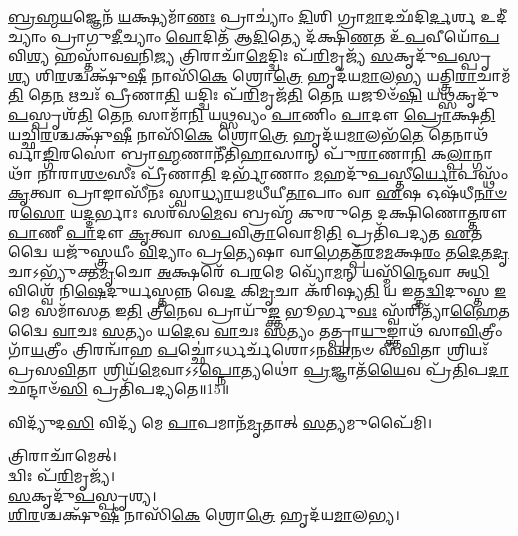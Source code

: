 {\-\ul{𑌬𑍍𑌰}\-\-\ul{𑌹𑍍𑌮}\-\-\ul{𑌯}\-𑌜𑍍𑌞𑍇𑌨᳴ \ul{𑌯}\-𑌕𑍍𑌷𑍍𑌯𑌮𑌾᳴\-\ul{𑌣𑌃} 𑌪𑍍𑌰𑌾𑌚𑍍𑌯𑌾𑌂॑ \ul{𑌦𑌿}\-𑌶𑌿 𑌗𑍍𑌰𑌾\-\ul{𑌮𑌾}\-𑌦𑌛᳴𑌦𑌿\-\ul{𑌰𑍍𑌦}\-𑌰𑍍\mbox{}𑌶 𑌉𑌦𑍀॑𑌚𑍍𑌯𑌾𑌂 𑌪𑍍𑌰𑌾𑌗𑍁\-\ul{𑌦𑍀}\-𑌚𑍍𑌯𑌾𑌂 \ul{𑌵𑍋}\-𑌦𑌿𑌤᳴ 𑌆\-\ul{𑌦𑌿}\-𑌤𑍍𑌯𑍇 𑌦᳴𑌕𑍍𑌷𑌿\-\ul{𑌣}\-𑌤 𑌉᳴\-\ul{𑌪}\-𑌵𑍀𑌯𑍋᳴\-\ul{𑌪}\-𑌵𑌿\-\ul{𑌶𑍍𑌯} 𑌹𑌸𑍍𑌤𑌾᳴𑌵\-\ul{𑌵}\-𑌨𑌿\-\ul{𑌜𑍍𑌯} 𑌤𑍍𑌰𑌿𑌰𑌾𑌚𑌾᳴\-\ul{𑌮𑍇}\-𑌦𑍍𑌦𑍍𑌵𑌿𑌃 𑌪᳴\-\ul{𑌰𑌿}\-𑌮𑍃𑌜𑍍𑌯᳴ \ul{𑌸}\-𑌕𑍃𑌦𑍁᳴\-\ul{𑌪}\-𑌸𑍍𑌪𑍃\-\ul{𑌶𑍍𑌯} 𑌶𑌿\-\ul{𑌰}\-𑌶𑍍𑌚𑌕𑍍𑌷𑍁᳴\-\ul{𑌷𑍀} 𑌨𑌾𑌸𑌿᳴\-\ul{𑌕𑍇} 𑌶𑍍𑌰𑍋\-\ul{𑌤𑍍𑌰𑍇} 𑌹𑍃𑌦᳴𑌯\-\ul{𑌮𑌾}\-𑌲\-\ul{𑌭𑍍𑌯} 𑌯𑌤𑍍𑌤𑍍𑌰𑌿\-\ul{𑌰𑌾}\-𑌚𑌾𑌮᳴\-\ul{𑌤𑌿} 𑌤𑍇\-\ul{𑌨} 𑌋𑌚𑌃᳴ 𑌪𑍍𑌰𑍀𑌣𑌾\-\ul{𑌤𑌿} 𑌯𑌦𑍍𑌦𑍍𑌵𑌿𑌃 𑌪᳴\-\ul{𑌰𑌿}\-𑌮𑍃𑌜᳴\-\ul{𑌤𑌿} 𑌤𑍇\-\ul{𑌨} 𑌯𑌜𑍂𑍞᳴\-\ul{𑌷𑌿} 𑌯\-\ul{𑌥𑍍𑌸}\-𑌕𑍃𑌦𑍁᳴\-\ul{𑌪}\-𑌸𑍍𑌪𑍃𑌶᳴\-\ul{𑌤𑌿} 𑌤𑍇\-\ul{𑌨} 𑌸𑌾𑌮𑌾᳴\-\ul{𑌨𑌿} 𑌯\-\ul{𑌥𑍍𑌸}\-𑌵𑍍𑌯𑌂 \ul{𑌪𑌾}\-𑌣𑌿𑌂 \ul{𑌪𑌾}\-𑌦𑍗 \ul{𑌪𑍍𑌰𑍋}\-𑌕𑍍𑌷\-\ul{𑌤𑌿} 𑌯𑌚𑍍𑌛𑌿\-\ul{𑌰}\-𑌶𑍍𑌚𑌕𑍍𑌷𑍁᳴\-\ul{𑌷𑍀} 𑌨𑌾𑌸𑌿᳴\-\ul{𑌕𑍇} 𑌶𑍍𑌰𑍋\-\ul{𑌤𑍍𑌰𑍇} 𑌹𑍃𑌦᳴𑌯\-\ul{𑌮𑌾}\-𑌲𑌭᳴\-\ul{𑌤𑍇} 𑌤𑍇𑌨𑌾𑌥᳴𑌰𑍍𑌵𑌾\-\ul{𑌙𑍍𑌗𑌿}\-𑌰𑌸𑍋॑ 𑌬𑍍𑌰𑌾\-\ul{𑌹𑍍𑌮}\-𑌣𑌾𑌨𑍀᳴𑌤𑌿\-\ul{𑌹𑌾}\-𑌸𑌾𑌨𑍍 𑌪𑍁᳴\-\ul{𑌰𑌾}\-𑌣𑌾\-\ul{𑌨𑌿} 𑌕\-\ul{𑌲𑍍𑌪𑌾}\-𑌨𑍍𑌗𑌾𑌥𑌾᳴ 𑌨𑌾𑌰𑌾\-\ul{𑌶}\-\-\ul{𑍞}\-𑌸𑍀𑌃 𑌪𑍍𑌰𑍀᳴𑌣𑌾\-\ul{𑌤𑌿} 𑌦𑌰𑍍𑌭𑌾᳴𑌣𑌾𑌂 \ul{𑌮}\-𑌹𑌦𑍁᳴\-\ul{𑌪}\-𑌸𑍍𑌤𑍀\-\ul{𑌰𑍍𑌯𑍋}\-𑌪𑌸𑍍𑌥𑌂᳴ \ul{𑌕𑍃}\-𑌤𑍍𑌵𑌾 𑌪𑍍𑌰𑌾𑌙𑌾𑌸𑍀᳴𑌨𑌃 𑌸𑍍𑌵𑌾\-\ul{𑌧𑍍𑌯𑌾}\-𑌯𑌮𑌧𑍀᳴𑌯𑍀\-\ul{𑌤𑌾}\-𑌪𑌾𑌂 𑌵𑌾 \ul{𑌏}\-𑌷 𑌓𑌷᳴𑌧𑍀\-\ul{𑌨𑌾}\-\-\ul{𑍞} 𑌰\-\ul{𑌸𑍋} 𑌯\-\ul{𑌦𑍍𑌦}\-𑌰𑍍𑌭𑌾𑌃 𑌸𑌰᳴𑌸\-\ul{𑌮𑍇}\-𑌵 𑌬𑍍𑌰𑌹𑍍𑌮᳴ 𑌕𑍁𑌰𑍁𑌤𑍇 𑌦𑌕𑍍𑌷𑌿𑌣𑍋\-\ul{𑌤𑍍𑌤}\-𑌰𑍗 \ul{𑌪𑌾}\-𑌣𑍀 \ul{𑌪𑌾}\-𑌦𑍗 \ul{𑌕𑍃}\-𑌤𑍍𑌵𑌾 𑌸\-\ul{𑌪}\-𑌵𑌿\-\ul{𑌤𑍍𑌰𑌾}\-𑌵𑍋𑌮𑌿\-\ul{𑌤𑌿} 𑌪𑍍𑌰𑌤𑌿᳴𑌪𑌦𑍍𑌯𑌤 \ul{𑌏}\-𑌤𑌦𑍍𑌵𑍈 𑌯𑌜𑍁᳴𑌸𑍍𑌤𑍍𑌰𑌯𑍀𑌂 \ul{𑌵𑌿}\-𑌦𑍍𑌯𑌾𑌂 𑌪𑍍𑌰\-\ul{𑌤𑍍𑌯𑍇}\-𑌷𑌾 𑌵𑌾\-\ul{𑌗𑍇}\-𑌤𑌤𑍍𑌪᳴\-\ul{𑌰}\-𑌮\-\ul{𑌮}\-𑌕𑍍𑌷\-\ul{𑌰𑌂} 𑌤\-\ul{𑌦𑍇}\-𑌤\-\ul{𑌦𑍃}\-𑌚𑌾𑌽𑌭𑍍𑌯𑍁᳴𑌕𑍍𑌤\-\ul{𑌮𑍃}\-𑌚𑍋 \ul{𑌅}\-𑌕𑍍𑌷𑌰𑍇᳴ 𑌪\-\ul{𑌰}\-𑌮𑍇 𑌵𑍍𑌯𑍋᳴\-\ul{𑌮}\-𑌨𑍍 𑌯𑌸𑍍𑌮𑌿᳴\-\ul{𑌨𑍍𑌦𑍇}\-𑌵𑌾 𑌅\-\ul{𑌧𑌿} 𑌵𑌿𑌶𑍍𑌵𑍇᳴ 𑌨𑌿\-\ul{𑌷𑍇}\-𑌦𑍁𑌰𑍍𑌯𑌸𑍍𑌤𑌨𑍍𑌨 𑌵𑍇\-\ul{𑌦} 𑌕𑌿\-\ul{𑌮𑍃}\-𑌚𑌾 𑌕᳴𑌰𑌿𑌷𑍍𑌯\-\ul{𑌤𑌿} 𑌯 𑌇𑌤𑍍𑌤\-\ul{𑌦𑍍𑌵𑌿}\-𑌦𑍁𑌸𑍍𑌤 \ul{𑌇}\-𑌮𑍇 𑌸𑌮𑌾᳴𑌸\-\ul{𑌤} 𑌇\-\ul{𑌤𑌿} 𑌤𑍍𑌰𑍀\-\ul{𑌨𑍇}\-𑌵 𑌪𑍍𑌰𑌾𑌯𑍁᳴\-\ul{𑌙𑍍𑌕𑍍𑌤} 𑌭𑍂𑌰𑍍𑌭𑍁\-\ul{𑌵𑌃} 𑌸𑍍𑌵᳴𑌰𑌿𑌤𑍍𑌯𑌾᳴\-\ul{𑌹𑍈}\-𑌤𑌦𑍍𑌵𑍈 \ul{𑌵𑌾}\-𑌚𑌃 \ul{𑌸}\-𑌤𑍍𑌯𑌂 𑌯\-\ul{𑌦𑍇}\-𑌵 \ul{𑌵𑌾}\-𑌚𑌃 \ul{𑌸}\-𑌤𑍍𑌯𑌂 𑌤𑌤𑍍𑌪𑍍𑌰𑌾\-\ul{𑌯𑍁}\-𑌙𑍍𑌕𑍍𑌤𑌾𑌥᳴ 𑌸𑌾\-\ul{𑌵𑌿}\-𑌤𑍍𑌰𑍀𑌂 𑌗𑌾᳴\-\ul{𑌯}\-𑌤𑍍𑌰𑍀𑌂 𑌤𑍍𑌰𑌿𑌰𑌨𑍍𑌵𑌾᳴𑌹 \ul{𑌪}\-𑌚𑍍𑌛𑍋॑𑌽𑌰𑍍𑌧𑌰𑍍𑌚᳴𑌶𑍋𑌽𑌨\-\ul{𑌵𑌾}\-𑌨𑍞 𑌸᳴\-\ul{𑌵𑌿}\-𑌤𑌾 𑌶𑍍𑌰𑌿𑌯𑌃᳴ 𑌪𑍍𑌰𑌸\-\ul{𑌵𑌿}\-𑌤𑌾 𑌶𑍍𑌰𑌿𑌯᳴\-\ul{𑌮𑍇}\-𑌵𑌾𑌽𑌽\-\ul{𑌪𑍍𑌨𑍋}\-𑌤𑍍𑌯𑌥𑍋॑ \ul{𑌪𑍍𑌰}\-𑌜𑍍𑌞𑌾𑌤᳴\-\ul{𑌯𑍈}\-𑌵 𑌪𑍍𑌰᳴\-\ul{𑌤𑌿}\-𑌪\-\ul{𑌦𑌾} 𑌛𑌨𑍍𑌦𑌾𑍞᳴\-\ul{𑌸𑌿} 𑌪𑍍𑌰𑌤𑌿᳴𑌪𑌦𑍍𑌯𑌤𑍇॥15॥


}

𑌵𑌿𑌦𑍍𑌯𑍁᳴𑌦\-\ul{𑌸𑌿} 𑌵𑌿𑌦𑍍𑌯᳴ 𑌮𑍇 \ul{𑌪𑌾}\-𑌪𑌮𑌾𑌨᳴\-\ul{𑌮𑍃}\-𑌤𑌾𑌤𑍍 \ul{𑌸}\-𑌤𑍍𑌯𑌮𑍁𑌪𑍈᳴𑌮𑌿।

𑌤𑍍𑌰𑌿𑌰𑌾𑌚𑌾᳴𑌮𑍇𑌤𑍍।\\
𑌦𑍍𑌵𑌿𑌃 𑌪᳴\-\ul{𑌰𑌿}\-𑌮𑍃𑌜𑍍𑌯᳴।\\
\-\ul{𑌸}\-𑌕𑍃𑌦𑍁᳴\-\ul{𑌪}\-𑌸𑍍𑌪𑍃𑌶𑍍𑌯।\\
\-\ul{𑌶𑌿}\-\-\ul{𑌰}\-𑌶𑍍𑌚𑌕𑍍𑌷𑍁᳴\-\ul{𑌷𑍀} 𑌨𑌾𑌸𑌿᳴\-\ul{𑌕𑍇} 𑌶𑍍𑌰𑍋\-\ul{𑌤𑍍𑌰𑍇} 𑌹𑍃𑌦᳴𑌯\-\ul{𑌮𑌾}\-𑌲𑌭𑍍𑌯।

